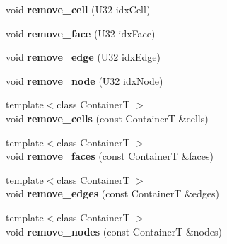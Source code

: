 \begin{DoxyCompactItemize}
\item 
\hypertarget{classps_1_1elastic_1_1VolMesh_aa9d69b01b41d133ff7f3041fc9c05ece}{}void {\bfseries remove\+\_\+cell} (U32 idx\+Cell)\label{classps_1_1elastic_1_1VolMesh_aa9d69b01b41d133ff7f3041fc9c05ece}

\item 
\hypertarget{classps_1_1elastic_1_1VolMesh_a263a2a1505154aaa2bb2ebce3b50dc98}{}void {\bfseries remove\+\_\+face} (U32 idx\+Face)\label{classps_1_1elastic_1_1VolMesh_a263a2a1505154aaa2bb2ebce3b50dc98}

\item 
\hypertarget{classps_1_1elastic_1_1VolMesh_afdd3edf9cb3474951122beec3896f7d2}{}void {\bfseries remove\+\_\+edge} (U32 idx\+Edge)\label{classps_1_1elastic_1_1VolMesh_afdd3edf9cb3474951122beec3896f7d2}

\item 
\hypertarget{classps_1_1elastic_1_1VolMesh_a4f5b66732b5343ac3845e6638b557491}{}void {\bfseries remove\+\_\+node} (U32 idx\+Node)\label{classps_1_1elastic_1_1VolMesh_a4f5b66732b5343ac3845e6638b557491}

\item 
\hypertarget{classps_1_1elastic_1_1VolMesh_ab165c26790cfc1a4e2260ccecae93ff0}{}{\footnotesize template$<$class Container\+T $>$ }\\void {\bfseries remove\+\_\+cells} (const Container\+T \&cells)\label{classps_1_1elastic_1_1VolMesh_ab165c26790cfc1a4e2260ccecae93ff0}

\item 
\hypertarget{classps_1_1elastic_1_1VolMesh_ac42ae75f8d206a2f483c8a268cf98c8b}{}{\footnotesize template$<$class Container\+T $>$ }\\void {\bfseries remove\+\_\+faces} (const Container\+T \&faces)\label{classps_1_1elastic_1_1VolMesh_ac42ae75f8d206a2f483c8a268cf98c8b}

\item 
\hypertarget{classps_1_1elastic_1_1VolMesh_a8929becd264cb9ded00c74c536a8cf26}{}{\footnotesize template$<$class Container\+T $>$ }\\void {\bfseries remove\+\_\+edges} (const Container\+T \&edges)\label{classps_1_1elastic_1_1VolMesh_a8929becd264cb9ded00c74c536a8cf26}

\item 
\hypertarget{classps_1_1elastic_1_1VolMesh_af8aae2ff9d1031e8d4306bd4cdce9e82}{}{\footnotesize template$<$class Container\+T $>$ }\\void {\bfseries remove\+\_\+nodes} (const Container\+T \&nodes)\label{classps_1_1elastic_1_1VolMesh_af8aae2ff9d1031e8d4306bd4cdce9e82}


\end{DoxyCompactItemize}
